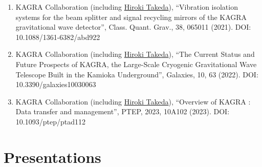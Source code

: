 \documentclass[uplatex, 12pt]{article}
\begin{document}
\begin{enumerate}
\item KAGRA Collaboration (including \uline{Hiroki Takeda}), “Vibration isolation systems for the beam splitter and signal recycling mirrors of the KAGRA gravitational wave detector”, Class. Quant. Grav., 38, 065011 (2021). DOI: 10.1088/1361-6382/abd922
\item KAGRA Collaboration (including \uline{Hiroki Takeda}), “The Current Status and Future Prospects of KAGRA, the Large-Scale Cryogenic Gravitational Wave Telescope Built in the Kamioka Underground”, Galaxies, 10, 63 (2022). DOI: 10.3390/galaxies10030063
\item KAGRA Collaboration (including \uline{Hiroki Takeda}), “Overview of KAGRA : Data transfer and management”, PTEP, 2023, 10A102 (2023). DOI: 10.1093/ptep/ptad112
\end{enumerate}


\section*{Presentations}
\end{document}
